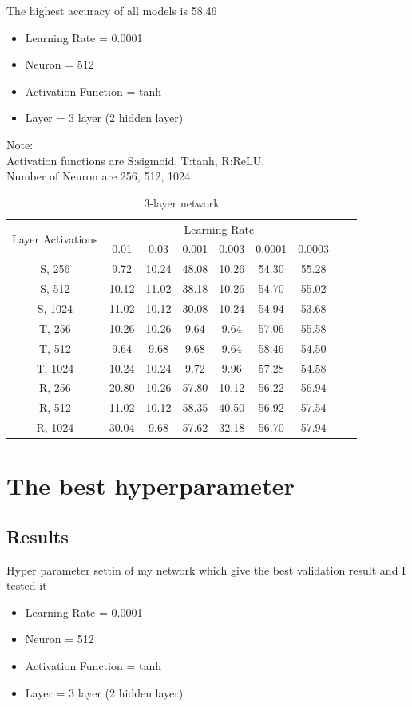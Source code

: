 \documentclass{article}
\begin{document}
The highest accuracy of all models is 58.46


\begin{itemize}
	\item Learning Rate = 0.0001 
	\item Neuron = 512
	\item Activation Function = tanh
	\item Layer = 3 layer (2 hidden layer)
\end{itemize}

Note:\\
Activation functions are S:sigmoid, T:tanh, R:ReLU.\\
Number of Neuron are 256, 512, 1024 \\

\begin{table}[htbp]
    \centering
    \begin{tabular}{|c|c|c|c|c|c|c|c|c|}
    \hline
    \multirow{2}{5em}{Layer Activations} & \multicolumn{6}{c|}{Learning Rate} \\
        & 0.01 & 0.03 & 0.001 & 0.003 & 0.0001 & 0.0003 \\
        \hline \hline
        S, 256  & 9.72 & 10.24 & 48.08 & 10.26 & 54.30 & 55.28 \\
        S, 512  & 10.12 & 11.02 & 38.18 & 10.26 & 54.70 & 55.02  \\
        S, 1024  & 11.02 & 10.12 & 30.08 & 10.24 & 54.94 & 53.68 \\
        T, 256  & 10.26 & 10.26 & 9.64 & 9.64 & 57.06 & 55.58 \\
        T, 512  & 9.64 & 9.68 & 9.68 & 9.64 & 58.46 & 54.50\\
        T, 1024  & 10.24 & 10.24 & 9.72 & 9.96 & 57.28 & 54.58 \\
        R, 256  & 20.80 & 10.26 & 57.80 & 10.12 & 56.22 & 56.94 \\
        R, 512  & 11.02 & 10.12 & 58.35 & 40.50 & 56.92 & 57.54 \\
        R, 1024  & 30.04 & 9.68 & 57.62 & 32.18 & 56.70 & 57.94 \\
        \hline
    \end{tabular}
    \caption{3-layer network}
    \label{tab:3layer}
\end{table}

\section{The best hyperparameter}
\subsection{Results}
Hyper parameter settin of my network which give the best validation result and I tested it
\begin{itemize}
	\item Learning Rate = 0.0001 
	\item Neuron = 512
	\item Activation Function = tanh
	\item Layer = 3 layer (2 hidden layer)
\end{itemize}
\end{document}
